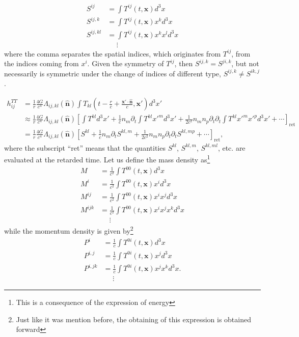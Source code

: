 \begin{align*}
S^{ij} & =\int T^{ij}\left(t,\boldsymbol{x}\right)d^{3}x\\
S^{ij,k} & =\int T^{ij}\left(t,\boldsymbol{x}\right)x^{k}d^{3}x\\
S^{ij,kl} & =\int T^{ij}\left(t,\boldsymbol{x}\right)x^{k}x^{l}d^{3}x\\
\  & \ \ \ \ \ \ \vdots
\end{align*}
where the comma separates the spatial indices, which originates from
$T^{ij}$, from the indices coming from $x^{i}$. Given the symmetry
of $T^{ij}$, then $S^{ij,k}=S^{ji,k}$, but not necessarily is symmetric
under the change of indices of different type, $S^{ij,k}\neq S^{ik,j}$.

\begin{align}
h_{ij}^{TT} & =\frac{1}{r}\frac{4G}{c^{4}}\Lambda_{ij,kl}\left(\hat{\boldsymbol{n}}\right)\int T_{kl}\left(t-\frac{r}{c}+\frac{\boldsymbol{x}'\cdot\hat{\boldsymbol{n}}}{c},\boldsymbol{x}'\right)d^{3}x'\\
\  & \approx\frac{1}{r}\frac{4G}{c^{4}}\Lambda_{ij,kl}\left(\hat{\boldsymbol{n}}\right)\left[\int T^{kl}d^{3}x'+\frac{1}{c}n_{m}\partial_{t}\int T^{kl}{x'}^{m}d^{3}x'+\frac{1}{2c^{2}}n_{m}n_{p}\partial_{t}\partial_{t}\int T^{kl}{x'}^{m}{x'}^{p}d^{3}x'+\cdots\right]_{\text{ret}}\\
\  & =\frac{1}{r}\frac{4G}{c^{4}}\Lambda_{ij,kl}\left(\hat{\boldsymbol{n}}\right)\left[S^{kl}+\frac{1}{c}n_{m}\partial_{t}S^{kl,m}+\frac{1}{2c^{2}}n_{m}n_{p}\partial_{t}\partial_{t}S^{kl,mp}+\cdots\right]_{\text{ret}},\label{eq:h-exp-s}
\end{align}
where the subscript ``ret'' means that the quantities $S^{kl}$,
$S^{kl,m}$, $S^{kl,ml}$, etc. are evaluated at the retarded time.
Let us define the mass density as\footnote{This is a consequence of the expression of energy}
\begin{align*}
M & =\frac{1}{c^{2}}\int T^{00}\left(t,\boldsymbol{x}\right)d^{3}x\\
M^{i} & =\frac{1}{c^{2}}\int T^{00}\left(t,\boldsymbol{x}\right)x^{i}d^{3}x\\
M^{ij} & =\frac{1}{c^{2}}\int T^{00}\left(t,\boldsymbol{x}\right)x^{i}x^{j}d^{3}x\\
M^{ijk} & =\frac{1}{c^{2}}\int T^{00}\left(t,\boldsymbol{x}\right)x^{i}x^{j}x^{k}d^{3}x\\
\  & \ \ \ \ \ \ \vdots
\end{align*}
while the momentum density is given by\footnote{Just like it was mention before, the obtaining of this expression is
obtained forward}
\begin{align*}
P^{i} & =\frac{1}{c}\int T^{0i}\left(t,\boldsymbol{x}\right)d^{3}x\\
P^{i,j} & =\frac{1}{c}\int T^{0i}\left(t,\boldsymbol{x}\right)x^{j}d^{3}x\\
P^{i,jk} & =\frac{1}{c}\int T^{0i}\left(t,\boldsymbol{x}\right)x^{j}x^{k}d^{3}x.\\
\  & \ \ \ \ \ \ \vdots
\end{align*}

